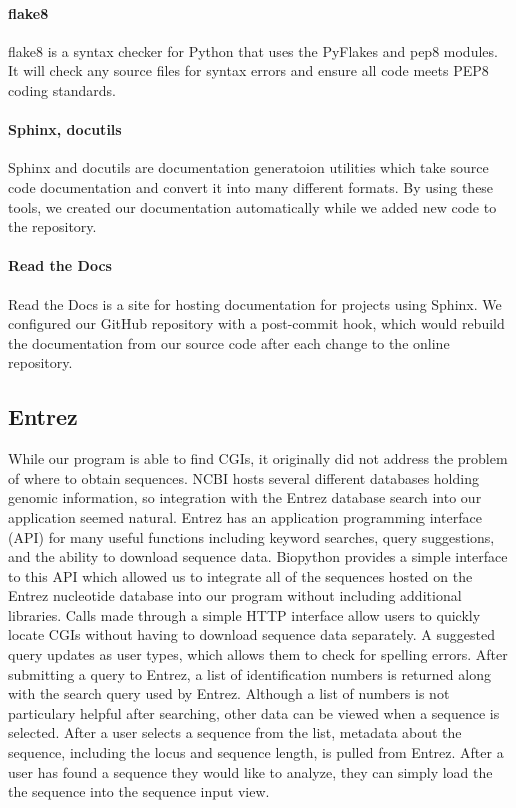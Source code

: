 \documentclass{bioinfo}
\begin{document}
\paragraph{flake8\textcolon} 
flake8 is a syntax checker for Python that uses the PyFlakes and pep8
modules. It will check any source files for syntax errors and ensure
all code meets PEP8 coding standards.
    
\paragraph{Sphinx, docutils\textcolon}
Sphinx and docutils are documentation generatoion utilities which take
source code documentation and convert it into many different
formats. By using these tools, we created our documentation
automatically while we added new code to the repository.

\paragraph{Read the Docs\textcolon} 
Read the Docs is a site for hosting documentation for projects using
Sphinx. We configured our GitHub repository with a post-commit hook,
which would rebuild the documentation from our source code after each
change to the online repository.
      
\subsection{Entrez}

While our program is able to find CGIs, it originally did not address
the problem of where to obtain sequences. NCBI hosts several different
databases holding genomic information, so integration with the Entrez
database search into our application seemed natural. Entrez has an
application programming interface (API) for many useful functions
including keyword searches, query suggestions, and the ability to
download sequence data. Biopython provides a simple interface to this
API which allowed us to integrate all of the sequences hosted on the
Entrez nucleotide database into our program without including
additional libraries. Calls made through a simple HTTP interface allow
users to quickly locate CGIs without having to download sequence data
separately. A suggested query updates as user types, which allows them
to check for spelling errors. After submitting a query to Entrez, a
list of identification numbers is returned along with the search query
used by Entrez. Although a list of numbers is not particulary helpful
after searching, other data can be viewed when a sequence is
selected. After a user selects a sequence from the list, metadata
about the sequence, including the locus and sequence length, is pulled
from Entrez. After a user has found a sequence they would like to
analyze, they can simply load the the sequence into the sequence input view.
\end{document}
